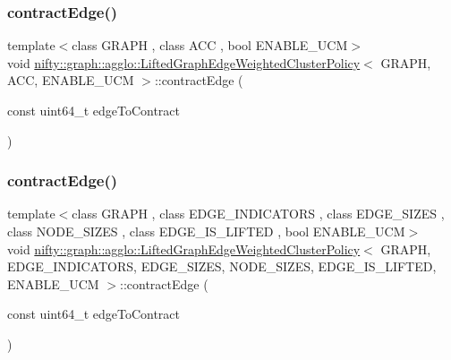 \subsubsection{\texorpdfstring{contract\+Edge()}{contractEdge()}\hspace{0.1cm}{\footnotesize\ttfamily [1/2]}}
{\footnotesize\ttfamily template$<$class G\+R\+A\+PH , class A\+CC , bool E\+N\+A\+B\+L\+E\+\_\+\+U\+CM$>$ \\
void \hyperlink{classnifty_1_1graph_1_1agglo_1_1LiftedGraphEdgeWeightedClusterPolicy}{nifty\+::graph\+::agglo\+::\+Lifted\+Graph\+Edge\+Weighted\+Cluster\+Policy}$<$ G\+R\+A\+PH, A\+CC, E\+N\+A\+B\+L\+E\+\_\+\+U\+CM $>$\+::contract\+Edge (\begin{DoxyParamCaption}\item[{const uint64\+\_\+t}]{edge\+To\+Contract }\end{DoxyParamCaption})}

\mbox{\label{classnifty_1_1graph_1_1agglo_1_1LiftedGraphEdgeWeightedClusterPolicy_a56bc42922fcf00d486cfebca957c18ab}} 
\subsubsection{\texorpdfstring{contract\+Edge()}{contractEdge()}\hspace{0.1cm}{\footnotesize\ttfamily [2/2]}}
{\footnotesize\ttfamily template$<$class G\+R\+A\+PH , class E\+D\+G\+E\+\_\+\+I\+N\+D\+I\+C\+A\+T\+O\+RS , class E\+D\+G\+E\+\_\+\+S\+I\+Z\+ES , class N\+O\+D\+E\+\_\+\+S\+I\+Z\+ES , class E\+D\+G\+E\+\_\+\+I\+S\+\_\+\+L\+I\+F\+T\+ED , bool E\+N\+A\+B\+L\+E\+\_\+\+U\+CM$>$ \\
void \hyperlink{classnifty_1_1graph_1_1agglo_1_1LiftedGraphEdgeWeightedClusterPolicy}{nifty\+::graph\+::agglo\+::\+Lifted\+Graph\+Edge\+Weighted\+Cluster\+Policy}$<$ G\+R\+A\+PH, E\+D\+G\+E\+\_\+\+I\+N\+D\+I\+C\+A\+T\+O\+RS, E\+D\+G\+E\+\_\+\+S\+I\+Z\+ES, N\+O\+D\+E\+\_\+\+S\+I\+Z\+ES, E\+D\+G\+E\+\_\+\+I\+S\+\_\+\+L\+I\+F\+T\+ED, E\+N\+A\+B\+L\+E\+\_\+\+U\+CM $>$\+::contract\+Edge (\begin{DoxyParamCaption}\item[{const uint64\+\_\+t}]{edge\+To\+Contract }\end{DoxyParamCaption})\hspace{0.3cm}{\ttfamily [inline]}}

